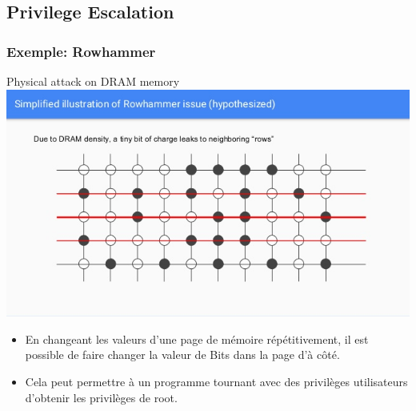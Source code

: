 \subsection{Privilege Escalation}
\begin{frame}
\frametitle{Exemple: Rowhammer}

\begin{center}
    Physical attack on DRAM memory\\
    \vspace{2em}
    \includegraphics[scale=0.24]{res/rowhammer}
\end{center}
\begin{itemize}
    \item En changeant les valeurs d'une page de mémoire répétitivement, il est possible de faire changer la valeur de Bits dans la page d'à côté.
    \item Cela peut permettre à un programme tournant avec des privilèges utilisateurs d'obtenir les privilèges de root.
\end{itemize}
\end{frame}





